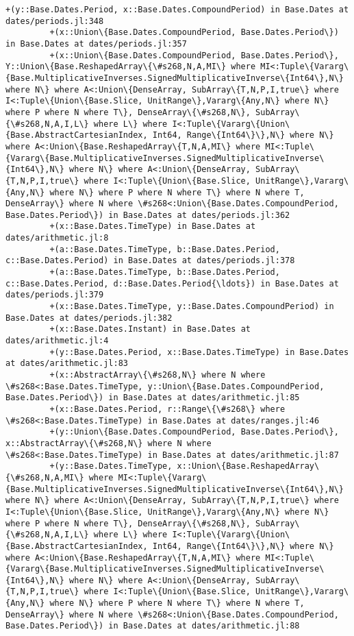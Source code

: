 \documentclass[11pt]{article}
\begin{document}
\begin{Verbatim}[commandchars=\\\{\}]
         +(y::Base.Dates.Period, x::Base.Dates.CompoundPeriod) in Base.Dates at dates/periods.jl:348
         +(x::Union\{Base.Dates.CompoundPeriod, Base.Dates.Period\}) in Base.Dates at dates/periods.jl:357
         +(x::Union\{Base.Dates.CompoundPeriod, Base.Dates.Period\}, Y::Union\{Base.ReshapedArray\{\#s268,N,A,MI\} where MI<:Tuple\{Vararg\{Base.MultiplicativeInverses.SignedMultiplicativeInverse\{Int64\},N\} where N\} where A<:Union\{DenseArray, SubArray\{T,N,P,I,true\} where I<:Tuple\{Union\{Base.Slice, UnitRange\},Vararg\{Any,N\} where N\} where P where N where T\}, DenseArray\{\#s268,N\}, SubArray\{\#s268,N,A,I,L\} where L\} where I<:Tuple\{Vararg\{Union\{Base.AbstractCartesianIndex, Int64, Range\{Int64\}\},N\} where N\} where A<:Union\{Base.ReshapedArray\{T,N,A,MI\} where MI<:Tuple\{Vararg\{Base.MultiplicativeInverses.SignedMultiplicativeInverse\{Int64\},N\} where N\} where A<:Union\{DenseArray, SubArray\{T,N,P,I,true\} where I<:Tuple\{Union\{Base.Slice, UnitRange\},Vararg\{Any,N\} where N\} where P where N where T\} where N where T, DenseArray\} where N where \#s268<:Union\{Base.Dates.CompoundPeriod, Base.Dates.Period\}) in Base.Dates at dates/periods.jl:362
         +(x::Base.Dates.TimeType) in Base.Dates at dates/arithmetic.jl:8
         +(a::Base.Dates.TimeType, b::Base.Dates.Period, c::Base.Dates.Period) in Base.Dates at dates/periods.jl:378
         +(a::Base.Dates.TimeType, b::Base.Dates.Period, c::Base.Dates.Period, d::Base.Dates.Period{\ldots}) in Base.Dates at dates/periods.jl:379
         +(x::Base.Dates.TimeType, y::Base.Dates.CompoundPeriod) in Base.Dates at dates/periods.jl:382
         +(x::Base.Dates.Instant) in Base.Dates at dates/arithmetic.jl:4
         +(y::Base.Dates.Period, x::Base.Dates.TimeType) in Base.Dates at dates/arithmetic.jl:83
         +(x::AbstractArray\{\#s268,N\} where N where \#s268<:Base.Dates.TimeType, y::Union\{Base.Dates.CompoundPeriod, Base.Dates.Period\}) in Base.Dates at dates/arithmetic.jl:85
         +(x::Base.Dates.Period, r::Range\{\#s268\} where \#s268<:Base.Dates.TimeType) in Base.Dates at dates/ranges.jl:46
         +(y::Union\{Base.Dates.CompoundPeriod, Base.Dates.Period\}, x::AbstractArray\{\#s268,N\} where N where \#s268<:Base.Dates.TimeType) in Base.Dates at dates/arithmetic.jl:87
         +(y::Base.Dates.TimeType, x::Union\{Base.ReshapedArray\{\#s268,N,A,MI\} where MI<:Tuple\{Vararg\{Base.MultiplicativeInverses.SignedMultiplicativeInverse\{Int64\},N\} where N\} where A<:Union\{DenseArray, SubArray\{T,N,P,I,true\} where I<:Tuple\{Union\{Base.Slice, UnitRange\},Vararg\{Any,N\} where N\} where P where N where T\}, DenseArray\{\#s268,N\}, SubArray\{\#s268,N,A,I,L\} where L\} where I<:Tuple\{Vararg\{Union\{Base.AbstractCartesianIndex, Int64, Range\{Int64\}\},N\} where N\} where A<:Union\{Base.ReshapedArray\{T,N,A,MI\} where MI<:Tuple\{Vararg\{Base.MultiplicativeInverses.SignedMultiplicativeInverse\{Int64\},N\} where N\} where A<:Union\{DenseArray, SubArray\{T,N,P,I,true\} where I<:Tuple\{Union\{Base.Slice, UnitRange\},Vararg\{Any,N\} where N\} where P where N where T\} where N where T, DenseArray\} where N where \#s268<:Union\{Base.Dates.CompoundPeriod, Base.Dates.Period\}) in Base.Dates at dates/arithmetic.jl:88

\end{Verbatim}
\end{document}
